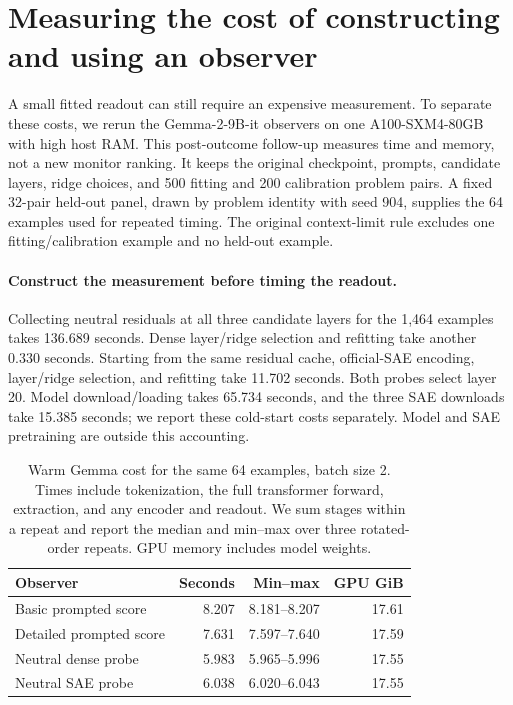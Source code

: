 \clearpage
\section{Measuring the cost of constructing and using an observer}
\label{app:observer-costs}

A small fitted readout can still require an expensive measurement. To separate
these costs, we rerun the Gemma-2-9B-it observers on one A100-SXM4-80GB with
high host RAM. This post-outcome follow-up measures time and memory, not a new
monitor ranking. It keeps the original checkpoint, prompts, candidate layers,
ridge choices, and 500 fitting and 200 calibration problem pairs. A fixed
32-pair held-out panel, drawn by problem identity with seed 904, supplies the
64 examples used for repeated timing. The original context-limit rule excludes
one fitting/calibration example and no held-out example.

\paragraph{Construct the measurement before timing the readout.}
Collecting neutral residuals at all three candidate layers for the 1,464
examples takes 136.689 seconds. Dense layer/ridge selection and refitting take
another 0.330 seconds. Starting from the same residual cache, official-SAE
encoding, layer/ridge selection, and refitting take 11.702 seconds. Both probes
select layer 20. Model download/loading takes 65.734 seconds, and the three SAE
downloads take 15.385 seconds; we report these cold-start costs separately.
Model and SAE pretraining are outside this accounting.

\begin{table}[H]
\centering
\small
\caption{Warm Gemma cost for the same 64 examples, batch size 2. Times include
tokenization, the full transformer forward, extraction, and any encoder and
readout. We sum stages within a repeat and report the median and min--max over
three rotated-order repeats. GPU memory includes model weights.}
\label{tab:observer-costs}
\begin{tabular}{@{}lrrr@{}}
\toprule
Observer & Seconds & Min--max & GPU GiB \\
\midrule
Basic prompted score & 8.207 & 8.181--8.207 & 17.61 \\
Detailed prompted score & 7.631 & 7.597--7.640 & 17.59 \\
Neutral dense probe & 5.983 & 5.965--5.996 & 17.55 \\
Neutral SAE probe & 6.038 & 6.020--6.043 & 17.55 \\
\bottomrule
\end{tabular}
\end{table}

